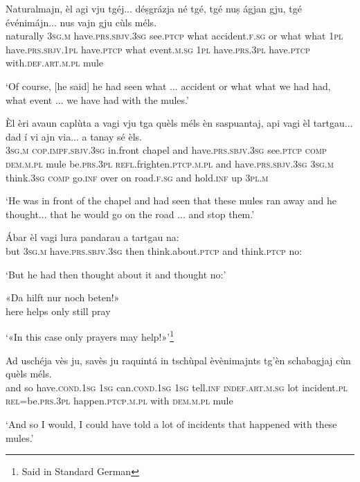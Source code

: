 \begin{linenumbers}
\gll Naturalmajn, èl agi vju tgéj... déṣgrázja né tgé, tgé nuṣ ágjan gju, tgé événimájn... nus vajn gju cùls méls.   \\
naturally \textsc{3sg.m} have.\textsc{prs.sbjv.3sg} see.\textsc{ptcp} what accident.\textsc{f.sg} or what what  \textsc{1pl} have.\textsc{prs.sbjv.1pl} have.\textsc{ptcp} what event.\textsc{m.sg}  \textsc{1pl} have.\textsc{prs.3pl} have.\textsc{ptcp} with.\textsc{def.art.m.pl} mule \\
\end{linenumbers}
\medskip
\glt `Of course, [he said] he had seen what ... accident or what what we had had, what event ... we have had with the mules.' 
\medskip

\begin{linenumbers}
\gll  Èl èri avaun caplùta a vagi vju tga quèls méls èn saspuantaj, api vagi èl tartgau... dad í vi ajn via... a tanay sé èls.  \\
 \textsc{3sg.m} \textsc{cop.impf.sbjv.3sg} in.front chapel and have.\textsc{prs.sbjv.3sg} see.\textsc{ptcp}  \textsc{comp} \textsc{dem.m.pl} mule be.\textsc{prs.3pl} \textsc{refl.}frighten.\textsc{ptcp.m.pl} and have.\textsc{prs.sbjv.3sg} \textsc{3sg.m} think.\textsc{3sg} \textsc{comp} go.\textsc{inf} over on road.\textsc{f.sg} and hold.\textsc{inf} up \textsc{3pl.m} \\
\end{linenumbers}
\medskip
\glt `He was in front of the chapel and had seen that these mules ran away and he thought... that he would go on the road ... and stop them.'
\medskip

\begin{linenumbers}
\gll   Ábar èl vagi lura pandarau a tartgau na: \\
but \textsc{3sg.m} have.\textsc{prs.sbjv.3sg} then think.about.\textsc{ptcp} and think.\textsc{ptcp} no: \\
\end{linenumbers}
\medskip
\glt `But he had then thought about it and thought no:'
\medskip

\begin{linenumbers}
\gll«Da hilft nur noch beten!»\\
here helps only still pray\\
\end{linenumbers}
\medskip
\glt `«In this case only prayers may help!»'\footnote{Said in Standard German}
\medskip

\begin{linenumbers}
\gll  Ad uschéja vès ju, savès ju raquintá in tschùpal èvènimajnts tg’èn schabagjaj cùn quèls méls.  \\
and so have.\textsc{cond.1sg} \textsc{1sg} can.\textsc{cond.1sg} \textsc{1sg} tell.\textsc{inf} \textsc{indef.art.m.sg} lot incident.\textsc{pl} \textsc{rel=}be.\textsc{prs.3pl} happen.\textsc{ptcp.m.pl} with \textsc{dem.m.pl} mule   \\
\end{linenumbers}
\medskip
\glt `And so I would, I could have told a lot of incidents that happened with these mules.'
\medskip


